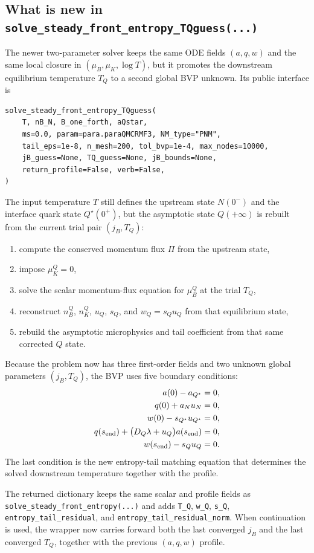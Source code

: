 \documentclass[11pt]{article}
\begin{document}
\subsection{What is new in \texttt{solve\_steady\_front\_entropy\_TQguess(...)}}
The newer two-parameter solver keeps the same ODE fields $(a,q,w)$ and the
same local closure in $(\mu_B,\mu_K,\log T)$, but it promotes the downstream
equilibrium temperature $T_Q$ to a second global BVP unknown. Its public
interface is
\begin{verbatim}
solve_steady_front_entropy_TQguess(
    T, nB_N, B_one_forth, aQstar,
    ms=0.0, param=para.paraQMCRMF3, NM_type="PNM",
    tail_eps=1e-8, n_mesh=200, tol_bvp=1e-4, max_nodes=10000,
    jB_guess=None, TQ_guess=None, jB_bounds=None,
    return_profile=False, verb=False,
)
\end{verbatim}
The input temperature $T$ still defines the upstream state $N(0^-)$ and the
interface quark state $Q^\star(0^+)$, but the asymptotic state $Q(+\infty)$
is rebuilt from the current trial pair $(j_B,T_Q)$:
\begin{enumerate}[leftmargin=1.5em]
\item compute the conserved momentum flux $\Pi$ from the upstream state,
\item impose $\mu_K^Q=0$,
\item solve the scalar momentum-flux equation for $\mu_B^Q$ at the trial $T_Q$,
\item reconstruct $n_B^Q$, $n_K^Q$, $u_Q$, $s_Q$, and
      $w_Q=s_Q u_Q$ from that equilibrium state,
\item rebuild the asymptotic microphysics and tail coefficient from that same
      corrected $Q$ state.
\end{enumerate}

Because the problem now has three first-order fields and two unknown global
parameters $(j_B,T_Q)$, the BVP uses five boundary conditions:
\begin{align}
a(0)-a_{Q^\star} &= 0,\\
q(0)+a_Nu_N &= 0,\\
w(0)-s_{Q^\star}u_{Q^\star} &= 0,\\
q(s_{\rm end})+\bigl(D_Q\lambda+u_Q\bigr)a(s_{\rm end}) &= 0,\\
w(s_{\rm end})-s_Qu_Q &= 0.
\end{align}
The last condition is the new entropy-tail matching equation that determines
the solved downstream temperature together with the profile.

The returned dictionary keeps the same scalar and profile fields as
\texttt{solve\_steady\_front\_entropy(...)} and adds
\texttt{T\_Q}, \texttt{w\_Q}, \texttt{s\_Q},
\texttt{entropy\_tail\_residual}, and
\texttt{entropy\_tail\_residual\_norm}. When continuation is used, the wrapper
now carries forward both the last converged $j_B$ and the last converged
$T_Q$, together with the previous $(a,q,w)$ profile.
\end{document}
